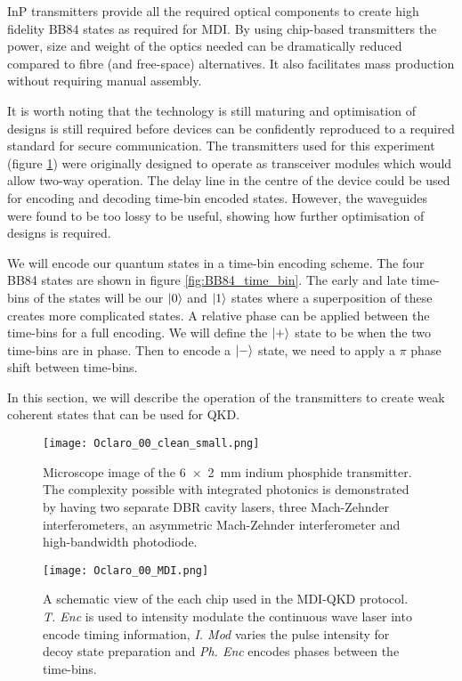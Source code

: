 \Ac{InP} transmitters provide all the required optical components to create high fidelity BB84 states as required for \ac{MDI}. By using chip-based transmitters the power, size and weight of the optics needed can be dramatically reduced compared to fibre (and free-space) alternatives. It also facilitates mass production without requiring manual assembly. 

It is worth noting that the technology is still maturing and optimisation of designs is still required before devices can be confidently reproduced to a required standard for secure communication. The transmitters used for this experiment (figure \ref{fig:oclaro_00}) were originally designed to operate as transceiver modules which would allow two-way operation. The delay line in the centre of the device could be used for encoding and decoding time-bin encoded states. However, the waveguides were found to be too lossy to be useful, showing how further optimisation of designs is required.

We will encode our quantum states in a time-bin encoding scheme. The four BB84 states are shown in figure \ref{fig:BB84_time_bin}. The early and late time-bins of the states will be our $\ket{0}$ and $\ket{1}$ states where a superposition of these creates more complicated states. A relative phase can be applied between the time-bins for a full encoding. We will define the $\ket{+}$ state to be when the two time-bins are in phase. Then to encode a $\ket{-}$ state, we need to apply a $\pi$ phase shift between time-bins. 

In this section, we will describe the operation of the transmitters to create weak coherent states that can be used for \acl{QKD}.

\begin{figure}[tbp]
	\centering
	\texttt{[image: Oclaro\_00\_clean\_small.png]}
	\caption[InP transmitter microscope image]{Microscope image of the \SI[product-units=power]{6x2}{mm} indium phosphide transmitter. The complexity possible with integrated photonics is demonstrated by having two separate DBR cavity lasers, three Mach-Zehnder interferometers, an asymmetric  Mach-Zehnder interferometer and high-bandwidth photodiode.}
	\label{fig:oclaro_00}
\end{figure}

\begin{figure}[tbp]
	\texttt{[image: Oclaro\_00\_MDI.png]}
	\caption[InP transmitter schematic]{A schematic view of the each chip used in the MDI-QKD protocol. \textit{T. Enc} is used to intensity modulate the continuous wave laser into encode timing information, \textit{I. Mod} varies the pulse intensity for decoy state preparation and \textit{Ph. Enc} encodes phases between the time-bins.}
	\label{fig:chip_mdi_schematic}
\end{figure}

